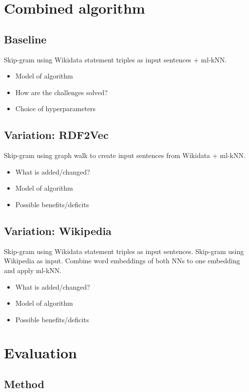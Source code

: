 \documentclass{scrartcl} %
\begin{document}
\section{Combined algorithm}

\subsection{Baseline}
Skip-gram using Wikidata statement triples as input sentences + ml-kNN.

\begin{itemize}
\item Model of algorithm
\item How are the challenges solved?
\item Choice of hyperparameters
\end{itemize}

\subsection{Variation: RDF2Vec}
Skip-gram using graph walk to create input sentences from Wikidata + ml-kNN.
\begin{itemize}
\item What is added/changed?
\item Model of algorithm
\item Possible benefits/deficits
\end{itemize}

\subsection{Variation: Wikipedia}
Skip-gram using Wikidata statement triples as input sentences.
Skip-gram using Wikipedia as input.
Combine word embeddings of both NNs to one embedding and apply ml-kNN.
\begin{itemize}
\item What is added/changed?
\item Model of algorithm
\item Possible benefits/deficits
\end{itemize}

\section{Evaluation}

\subsection{Method}
\end{document}
